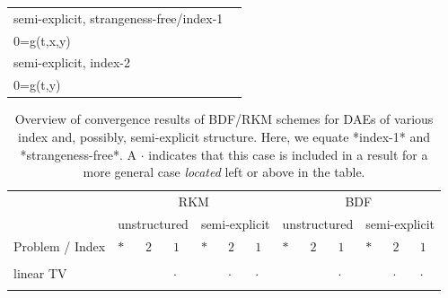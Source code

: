 \documentclass[]{book}
\theoremstyle{definition}
\theoremstyle{definition}
\theoremstyle{definition}
\theoremstyle{remark}
\begin{document}
\begin{longtable}[]{@{}ll@{}}
\begin{minipage}[t]{0.58\columnwidth}
semi-explicit, strangeness-free/index-1\strut
\end{minipage} & \begin{minipage}[t]{0.36\columnwidth}\raggedright
\(\begin{cases}\dot x= f(t, x, y) \\ 0=g(t,x,y) \end{cases}\)\strut
\end{minipage}\tabularnewline
\begin{minipage}[t]{0.58\columnwidth}\raggedright
semi-explicit, index-2\strut
\end{minipage} & \begin{minipage}[t]{0.36\columnwidth}\raggedright
\(\begin{cases}\dot x= f(t, x, y) \\ 0=g(t,y) \end{cases}\)\strut
\end{minipage}\tabularnewline
\bottomrule
\end{longtable}

\begin{table}

\caption{\label{tab:unnamed-chunk-1}Overview of convergence results of BDF/RKM schemes for DAEs of various index and, possibly, semi-explicit structure. Here, we equate *index-1* and *strangeness-free*. A $\cdot$ indicates that this case is included in a result for a more general case \emph{located} left or above in the table.}
\centering
\begin{tabular}[t]{lllllllllllll}
\toprule
\multicolumn{1}{c}{ } & \multicolumn{6}{c}{RKM} & \multicolumn{6}{c}{BDF} \\
\cmidrule(l{3pt}r{3pt}){2-7} \cmidrule(l{3pt}r{3pt}){8-13}
\multicolumn{1}{c}{ } & \multicolumn{3}{c}{unstructured} & \multicolumn{3}{c}{semi-explicit} & \multicolumn{3}{c}{unstructured} & \multicolumn{3}{c}{semi-explicit} \\
\cmidrule(l{3pt}r{3pt}){2-4} \cmidrule(l{3pt}r{3pt}){5-7} \cmidrule(l{3pt}r{3pt}){8-10} \cmidrule(l{3pt}r{3pt}){11-13}
Problem / Index & $*$ & $2$ & $1$ & $*$ & $2$ & $1$ & $*$ & $2$ & $1$ & $*$ & $2$ & $1$\\
\midrule
\cellcolor{gray!6}{nonlinear} & \cellcolor{gray!6}{} & \cellcolor{gray!6}{} & \cellcolor{gray!6}{c} & \cellcolor{gray!6}{} & \cellcolor{gray!6}{g,i} & \cellcolor{gray!6}{b} & \cellcolor{gray!6}{} & \cellcolor{gray!6}{} & \cellcolor{gray!6}{f} & \cellcolor{gray!6}{} & \cellcolor{gray!6}{h} & \cellcolor{gray!6}{e}\\
linear TV &  &  & $\cdot$ &  & $\cdot$ & $\cdot$ &  &  & $\cdot$ &  & $\cdot$ & $\cdot$\\
\cellcolor{gray!6}{linear CC} & \cellcolor{gray!6}{a} & \cellcolor{gray!6}{$\cdot$} & \cellcolor{gray!6}{$\cdot$} & \cellcolor{gray!6}{$\cdot$} & \cellcolor{gray!6}{$\cdot$} & \cellcolor{gray!6}{$\cdot$} & \cellcolor{gray!6}{d} & \cellcolor{gray!6}{$\cdot$} & \cellcolor{gray!6}{$\cdot$} & \cellcolor{gray!6}{$\cdot$} & \cellcolor{gray!6}{$\cdot$} & \cellcolor{gray!6}{$\cdot$}\\
\bottomrule
\end{tabular}
\end{table}
\end{document}
